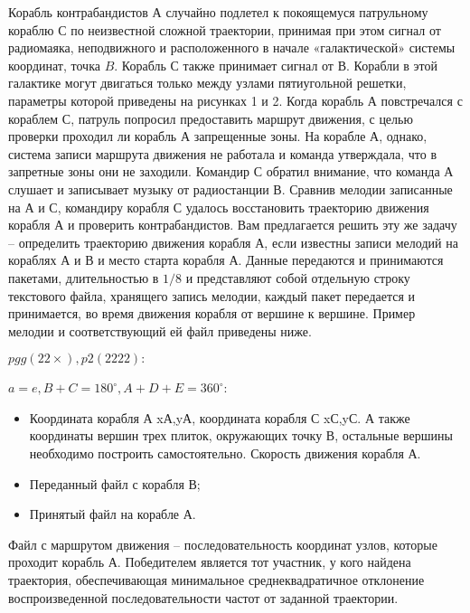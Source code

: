 
Корабль контрабандистов А случайно подлетел к покоящемуся патрульному кораблю С по неизвестной сложной траектории, принимая при этом сигнал от радиомаяка, неподвижного и расположенного в начале «галактической» системы координат, точка $B$. Корабль $С$ также принимает сигнал от $В$. Корабли в этой галактике могут двигаться только между узлами пятиугольной решетки, параметры которой приведены на рисунках 1 и 2. Когда корабль $А$ повстречался с кораблем $С$, патруль попросил предоставить маршрут движения, с целью проверки проходил ли корабль $А$ запрещенные зоны. На корабле $А$, однако, система записи маршрута движения не работала и команда утверждала, что в запретные зоны они не заходили. Командир $С$ обратил внимание, что команда $А$ слушает и записывает музыку от радиостанции $В$. Сравнив мелодии записанные на $А$ и $С$, командиру корабля $С$ удалось восстановить траекторию движения корабля $А$ и проверить контрабандистов. Вам предлагается решить эту же задачу – определить траекторию движения корабля $А$, если известны записи мелодий на кораблях $А$ и $В$ и место старта корабля $А$. Данные передаются и принимаются пакетами, длительностью в $1/8$ и представляют собой отдельную строку текстового файла, хранящего запись мелодии, каждый пакет передается и принимается, во время движения корабля от вершине к вершине. Пример мелодии и соответствующий ей файл приведены ниже.

$pgg (22×), p2 (2222):$

$a = e, B + C = 180^\circ, A + D + E = 360^\circ$:


\begin{itemize}
    \item Координата корабля А {xА,yА}, координата корабля С {xС,yС}. А также координаты вершин трех плиток, окружающих точку В, остальные вершины необходимо построить самостоятельно. Скорость движения корабля А.
    \item Переданный файл с корабля В;
    \item Принятый файл на корабле А.
\end{itemize}

\outputfmtSection

Файл с маршрутом движения – последовательность координат узлов, которые проходит корабль А.
Победителем является тот участник, у кого найдена траектория, обеспечивающая минимальное среднеквадратичное отклонение воспроизведенной последовательности частот от заданной траектории.

